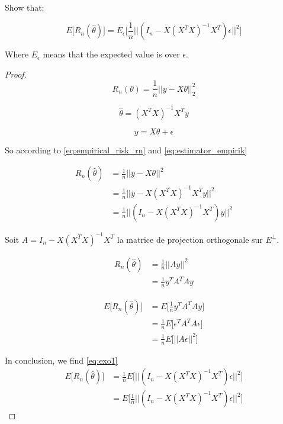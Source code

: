 

Show that:

\begin{equation} \label{eq:exo1}
    E \Big[ R_n (\hat{\theta}) \Big] = E_\epsilon \Big[ \frac{1}{n} || (I_n - X (X^T X)^{-1} X^T) \epsilon ||^2 \Big]
\end{equation}

Where $E_\epsilon$ means that the expected value is over $\epsilon$.\\

\begin{proof}
    \begin{equation} \label{eq:empirical_risk_rn}
        R_n(\theta) = \frac{1}{n} || y - X \theta ||^2_2
    \end{equation}
    
    
    \begin{equation} \label{eq:estimator_empirik}
        \hat{\theta} = (X^T X)^{-1} X^T y
    \end{equation}

    \begin{equation} \label{eq:linear_model}
        y = X \theta + \epsilon
    \end{equation}

    So according to \eqref{eq:empirical_risk_rn} and \eqref{eq:estimator_empirik}
    
    \begin{align*}
        R_n (\hat{\theta}) &= \frac{1}{n} || y - X \theta ||^2\\
            &= \frac{1}{n} || y - X (X^TX)^{-1} X^T y ||^2\\
            &= \frac{1}{n} || (I_n - X (X^TX)^{-1} X^T) y ||^2
    \end{align*}

    Soit $A = I_n - X (X^T X)^{-1} X^T$ la matrice de projection orthogonale sur $E^\perp$.

    \begin{align*}
        R_n (\hat{\theta}) &= \frac{1}{n} || A y ||^2\\
            &= \frac{1}{n} y^T A^T A y 
    \end{align*}

    
    \begin{align*}
         E \Big[ R_n (\hat{\theta}) \Big] &= E \Big [ \frac{1}{n} y^T A^T A y \Big ] \\
            &= \frac{1}{n}  E \Big [  \epsilon^T A^T A \epsilon \Big ] \\
            &= \frac{1}{n}  E \Big [  || A \epsilon  ||^2 \Big ]
    \end{align*}

    In conclusion, we find \eqref{eq:exo1}
    \begin{align*}
        E \Big[ R_n (\hat{\theta}) \Big] &= \frac{1}{n}  E \Big [  || (I_n - X (X^T X)^{-1} X^T) \epsilon  ||^2 \Big ] \\
            &= E \Big [ \frac{1}{n}    || (I_n - X (X^T X)^{-1} X^T) \epsilon  ||^2 \Big ]
    \end{align*}
    
\end{proof}

